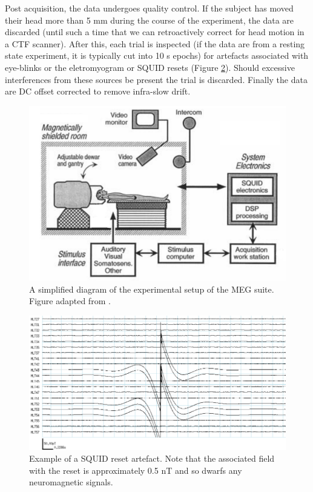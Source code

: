 Post acquisition, the data undergoes quality control. If the subject has moved their head more than 5 mm during the course of the experiment, the data are discarded (until such a time that we can retroactively correct for head motion in a CTF scanner). After this, each trial is inspected (if the data are from a resting state experiment, it is typically cut into 10 s epochs) for artefacts associated with eye-blinks or the eletromyogram or SQUID resets (Figure \ref{fig_1_a2}). Should excessive interferences from these sources be present the trial is discarded. Finally the data are DC offset corrected to remove infra-slow drift. 

\begin{figure}[h!]
	\begin{center}
		\includegraphics[width=\linewidth]{./images/chapter1/experimental_setup.png}\caption{A simplified diagram of the experimental setup of the MEG suite. Figure adapted from \cite{Vrba2001}.}\label{fig_1_a1}
	\end{center}
\end{figure}
\clearpage

\begin{figure}[h!]
	\begin{center}
		\includegraphics[width=0.78\linewidth]{./images/chapter1/SQUID_RESET.png}\caption{Example of a SQUID reset artefact. Note that the associated field with the reset is approximately 0.5 nT and so dwarfs any neuromagnetic signals.}\label{fig_1_a2}
	\end{center}
\end{figure}

